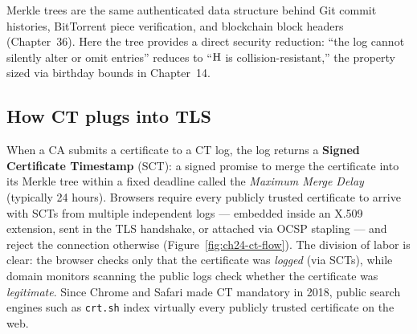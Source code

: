 \begin{connectionbox}
Merkle trees are the same authenticated data structure behind Git commit histories, BitTorrent piece verification, and blockchain block headers (Chapter~36). Here the tree provides a direct security reduction: ``the log cannot silently alter or omit entries'' reduces to ``$\operatorname{H}$ is collision-resistant,'' the property sized via birthday bounds in Chapter~14.
\end{connectionbox}

\subsection{How CT plugs into TLS}

When a CA submits a certificate to a CT log, the log returns a \textbf{Signed Certificate Timestamp} (SCT): a signed promise to merge the certificate into its Merkle tree within a fixed deadline called the \emph{Maximum Merge Delay} (typically 24 hours). Browsers require every publicly trusted certificate to arrive with SCTs from multiple independent logs --- embedded inside an X.509 extension, sent in the TLS handshake, or attached via OCSP stapling --- and reject the connection otherwise (Figure~\ref{fig:ch24-ct-flow}). The division of labor is clear: the browser checks only that the certificate was \emph{logged} (via SCTs), while domain monitors scanning the public logs check whether the certificate was \emph{legitimate}. Since Chrome and Safari made CT mandatory in 2018, public search engines such as \texttt{crt.sh} index virtually every publicly trusted certificate on the web.

